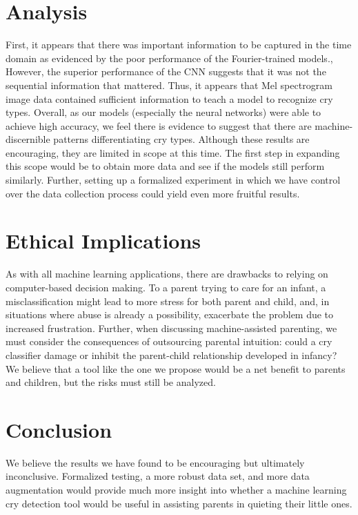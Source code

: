 \documentclass[11pt]{article}
\begin{document}
\section{Analysis}
First, it appears that there was important information to be captured in the time domain as evidenced by the poor performance of the Fourier-trained models., However, the superior performance of the CNN suggests that it was not the sequential information that mattered. 
Thus, it appears that Mel spectrogram image data contained sufficient information to teach a model to recognize cry types.
Overall, as our models (especially the neural networks) were able to achieve high accuracy, we feel there is evidence to suggest that there are machine-discernible patterns differentiating cry types.
Although these results are encouraging, they are limited in scope at this time.  
The first step in expanding this scope would be to obtain more data and see if the models still perform similarly. 
Further, setting up a formalized experiment in which we have control over the data collection process could yield even more fruitful results.

\section{Ethical Implications}
As with all machine learning applications, there are drawbacks to relying on computer-based decision making. 
To a parent trying to care for an infant, a misclassification might lead to more stress for both parent and child, and, in situations where abuse is already a possibility, exacerbate the problem due to increased frustration. 
Further, when discussing machine-assisted parenting, we must consider the consequences of outsourcing parental intuition: could a cry classifier damage or inhibit the parent-child relationship developed in infancy? 
We believe that a tool like the one we propose would be a net benefit to parents and children, but the risks must still be analyzed.
\section{Conclusion}
We believe the results we have found to be encouraging but ultimately inconclusive. Formalized testing, a more robust data set, and more data augmentation would provide much more insight into whether a machine learning cry detection tool would be useful in assisting parents in quieting their little ones. 
\end{document}
